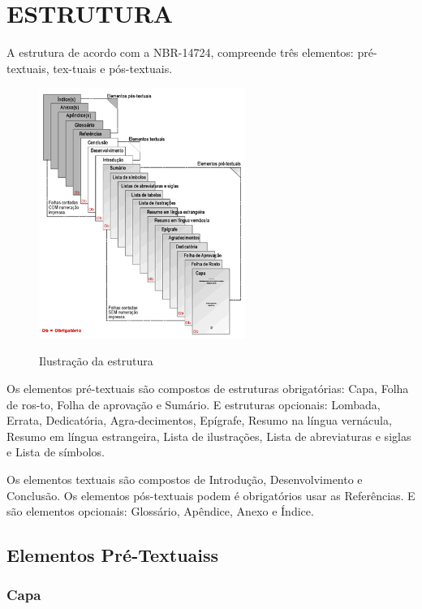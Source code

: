 %
%

\chapter{ESTRUTURA}

A estrutura de acordo com a NBR-14724, compreende três elementos: pré-textuais, tex-tuais e pós-textuais.

\begin{figure}[H]
    \centering
    \caption{Ilustração da estrutura}
    \includegraphics[width=0.6\textwidth]{figuras/abnt}
    \label{fig:ilustfig2}
\end{figure}

Os elementos pré-textuais são compostos de estruturas
obrigatórias: Capa, Folha de ros-to, Folha de aprovação e Sumário. E estruturas opcionais: Lombada, Errata, Dedicatória, Agra-decimentos, Epígrafe, Resumo na língua vernácula, Resumo em língua estrangeira, Lista de ilustrações, Lista de abreviaturas e siglas e Lista de símbolos.

Os elementos textuais são compostos de Introdução,
Desenvolvimento e Conclusão. Os elementos pós-textuais podem é obrigatórios usar as Referências.  E são elementos opcionais: Glossário, Apêndice, Anexo e Índice.

\section{Elementos Pré-Textuaiss}

\subsection{Capa}

